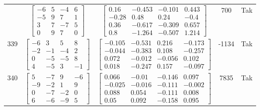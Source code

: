 \documentclass[a4paper,12pt]{article}
\begin{document}
\begin{tabular}{c c c c c}
&
$\begin{bmatrix} -6 & 5 & -4 & 6 \\ -5 & 9 & 7 & 1 \\ 3 & 7 & -7 & 5 \\ 0 & 9 & 7 & 0 \end{bmatrix}$
&
$\begin{bmatrix} 0.16 & -0.453 & -0.101 & 0.443 \\ -0.28 & 0.48 & 0.24 & -0.4 \\ 0.36 & -0.617 & -0.309 & 0.657 \\ 0.8 & -1.264 & -0.507 & 1.214 \end{bmatrix}$
&
700
&
Tak
\\
339
&
$\begin{bmatrix} -6 & 3 & 5 & 8 \\ -2 & -1 & -4 & 2 \\ 0 & -5 & -5 & 8 \\ 4 & -5 & 3 & -1 \end{bmatrix}$
&
$\begin{bmatrix} -0.105 & -0.531 & 0.216 & -0.173 \\ -0.044 & -0.383 & 0.108 & -0.257 \\ 0.072 & -0.012 & -0.056 & 0.102 \\ 0.018 & -0.247 & 0.157 & -0.097 \end{bmatrix}$
&
-1134
&
Tak
\\
340
&
$\begin{bmatrix} 5 & -7 & 9 & -6 \\ -9 & -2 & 1 & 9 \\ 0 & -7 & -2 & 0 \\ 6 & -6 & -9 & 5 \end{bmatrix}$
&
$\begin{bmatrix} 0.066 & -0.01 & -0.146 & 0.097 \\ -0.025 & -0.016 & -0.111 & -0.002 \\ 0.088 & 0.054 & -0.111 & 0.008 \\ 0.05 & 0.092 & -0.158 & 0.095 \end{bmatrix}$
&
7835
&
Tak
\\
\end{tabular} \egroup \newpage
\end{document}
